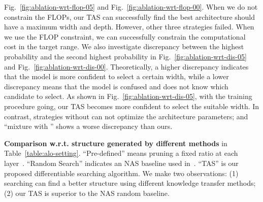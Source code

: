 \documentclass{article}
\def\Figref#1{Fig.~\ref{#1}}
\def\Tabref#1{Table~\ref{#1}}
\def\NAME{{TAS}}
\begin{document}
\Figref{fig:ablation-wrt-flop-05} and \Figref{fig:ablation-wrt-flop-00}.
When we do not constrain the FLOPs, our {\NAME} can successfully find the best architecture should have a maximum width and depth. However, other three strategies failed.
When we use the FLOP constraint, we can successfully constrain the computational cost in the target range.
We also investigate discrepancy between the highest probability and the second highest probability in \Figref{fig:ablation-wrt-dis-05} and \Figref{fig:ablation-wrt-dis-00}. Theoretically, a higher discrepancy indicates that the model is more confident to select a certain width, while a lower discrepancy means that the model is confused and does not know which candidate to select.
As shown in \Figref{fig:ablation-wrt-dis-05}, with the training procedure going, our {\NAME} becomes more confident to select the suitable width. In contrast, strategies without  can not optimize the architecture parameters; and ``mixture with '' shows a worse discrepancy than ours.





\textbf{Comparison w.r.t. structure generated by different methods} in \Tabref{table:alo-setting}.
``Pre-defined'' means pruning a fixed ratio at each layer~\cite{li2017pruning}.
``Random Search'' indicates an NAS baseline used in~\cite{liu2019darts}.
``{\NAME}'' is our proposed differentiable searching algorithm.
We make two observations: (1) searching can find a better structure using different knowledge transfer methods; (2) our {\NAME} is superior to the NAS random baseline.
\end{document}
